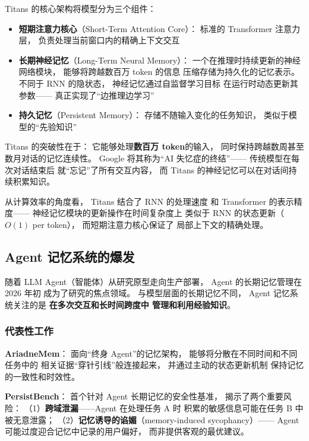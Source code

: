 Titans 的核心架构将模型分为三个组件：
\begin{itemize}[noitemsep]
  \item \textbf{短期注意力核心}（Short-Term Attention Core）：
        标准的 Transformer 注意力层，
        负责处理当前窗口内的精确上下文交互
  \item \textbf{长期神经记忆}（Long-Term Neural Memory）：
        一个在推理时持续更新的神经网络模块，
        能够将跨越数百万 token 的信息
        压缩存储为持久化的记忆表示。
        不同于 RNN 的隐状态，
        神经记忆通过自监督学习目标
        在运行时动态更新其参数——
        真正实现了``边推理边学习''
  \item \textbf{持久记忆}（Persistent Memory）：
        存储不随输入变化的任务知识，
        类似于模型的``先验知识''
\end{itemize}

Titans 的突破性在于：
它能够处理\textbf{数百万 token}的输入，
同时保持跨越数周甚至数月对话的记忆连续性。
Google 将其称为``AI 失忆症的终结''——
传统模型在每次对话结束后
就``忘记''了所有交互内容，
而 Titans 的神经记忆可以在对话间持续积累知识。

从计算效率的角度看，
Titans 结合了 RNN 的处理速度
和 Transformer 的表示精度——
神经记忆模块的更新操作在时间复杂度上
类似于 RNN 的状态更新（$O(1)$ per token），
而短期注意力核心保证了
局部上下文的精确处理。

\subsection{Agent 记忆系统的爆发}

随着 LLM Agent（智能体）从研究原型走向生产部署，
Agent 的长期记忆管理在 2026 年初
成为了研究的焦点领域。
与模型层面的长期记忆不同，
Agent 记忆系统关注的是
\textbf{在多次交互和长时间跨度中
管理和利用经验知识}。

\subsubsection{代表性工作}

\textbf{AriadneMem}：
面向``终身 Agent''的记忆架构，
能够将分散在不同时间和不同任务中的
相关证据``穿针引线''般连接起来，
并通过主动的状态更新机制
保持记忆的一致性和时效性。

\textbf{PersistBench}：
首个针对 Agent 长期记忆的安全性基准，
揭示了两个重要风险：
（1）\textbf{跨域泄漏}——Agent 在处理任务 A 时
积累的敏感信息可能在任务 B 中被无意泄露；
（2）\textbf{记忆诱导的谄媚}（memory-induced sycophancy）——
Agent 可能过度迎合记忆中记录的用户偏好，
而非提供客观的最优建议。

